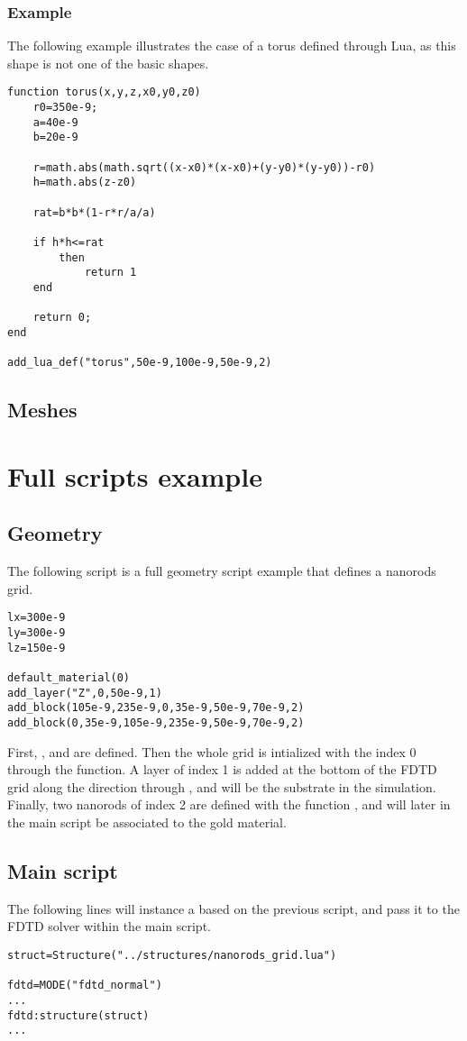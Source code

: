 \fwarn

\subsubsection{Example}

The following example illustrates the case of a torus defined through Lua, as this shape is not one of the basic shapes.
\begin{lstlisting}
function torus(x,y,z,x0,y0,z0)
	r0=350e-9;
	a=40e-9
	b=20e-9
	
	r=math.abs(math.sqrt((x-x0)*(x-x0)+(y-y0)*(y-y0))-r0)
	h=math.abs(z-z0)
	
	rat=b*b*(1-r*r/a/a)
	
	if h*h<=rat
		then
			return 1
	end
	
	return 0;
end

add_lua_def("torus",50e-9,100e-9,50e-9,2)
\end{lstlisting}

\subsection{Meshes}

\section{Full scripts example}

\subsection{Geometry}

The following script is a full geometry script example that defines a nanorods grid.

\begin{lstlisting}
lx=300e-9
ly=300e-9
lz=150e-9

default_material(0)
add_layer("Z",0,50e-9,1)
add_block(105e-9,235e-9,0,35e-9,50e-9,70e-9,2)
add_block(0,35e-9,105e-9,235e-9,50e-9,70e-9,2)
\end{lstlisting}

First, ,  and  are defined. Then the whole grid is intialized with the index 0 through the  function. A layer of index 1 is added at the bottom of the FDTD grid along the  direction through , and will be the substrate in the simulation. Finally, two nanorods of index 2 are defined with the function , and will later in the main script be associated to the gold material.

\subsection{Main script}

The following lines will instance a  based on the previous script, and pass it to the FDTD solver within the main script.
\begin{lstlisting}
struct=Structure("../structures/nanorods_grid.lua")

fdtd=MODE("fdtd_normal")
...
fdtd:structure(struct)
...
\end{lstlisting}